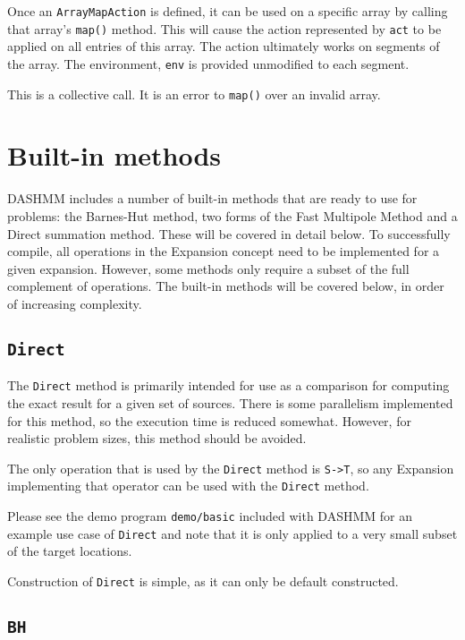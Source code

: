 Once an \texttt{ArrayMapAction} is defined, it can be used on a specific array
by calling that array's \texttt{map()} method. This will cause the action
represented by \texttt{act} to be applied on all entries of this array. The
action ultimately works on segments of the array. The environment, \texttt{env}
is provided unmodified to each segment.

This is a collective call. It is an error to \texttt{map()} over an invalid array.


\section{Built-in methods}
\label{sec:bi-met}

DASHMM includes a number of built-in methods that are ready to use for
problems: the Barnes-Hut method, two forms of the Fast Multipole Method and
a Direct summation method. These will be covered in detail below. To
successfully compile, all operations in the Expansion concept need to be
implemented for a given expansion. However, some methods only require a
subset of the full complement of operations. The built-in methods will be
covered below, in order of increasing complexity.

\subsection{\texttt{Direct}}

The \texttt{Direct} method is primarily intended for use as a comparison for
computing
the exact result for a given set of sources. There is some parallelism
implemented for this method, so the execution time is reduced somewhat.
However, for realistic problem sizes, this method should be avoided.

The only operation that is used by the \texttt{Direct} method is
\texttt{S->T}, so any Expansion implementing that operator can be used with the
\texttt{Direct} method.

Please see the demo program \texttt{demo/basic} included with DASHMM for an
example use case of \texttt{Direct} and note that it is only applied to a very
small subset of the target locations.

Construction of \texttt{Direct} is simple, as it can only be default
constructed.

\subsection{\texttt{BH}}

